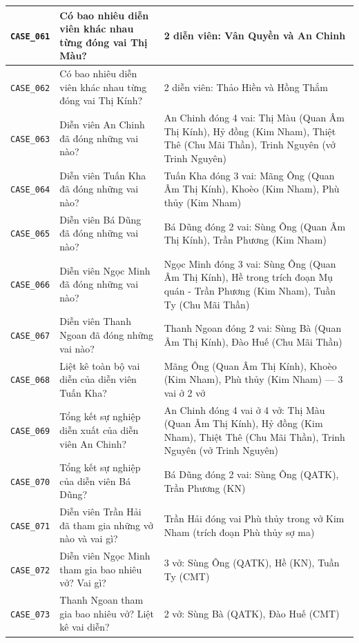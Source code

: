 \begin{longtable}{|p{1.9cm}|p{5.2cm}|p{7.3cm}|}
  \hline
  \texttt{CASE\_061} & Có bao nhiêu diễn viên khác nhau từng đóng vai Thị Màu? & 2 diễn viên: Vân Quyền và An Chinh \\
  \hline
  \texttt{CASE\_062} & Có bao nhiêu diễn viên khác nhau từng đóng vai Thị Kính? & 2 diễn viên: Thảo Hiền và Hồng Thắm \\
  \hline
  \texttt{CASE\_063} & Diễn viên An Chinh đã đóng những vai nào? & An Chinh đóng 4 vai: Thị Màu (Quan Âm Thị Kính), Hỷ đồng (Kim Nham), Thiệt Thê (Chu Mãi Thần), Trinh Nguyên (vở Trinh Nguyên) \\
  \hline
  \texttt{CASE\_064} & Diễn viên Tuấn Kha đã đóng những vai nào? & Tuấn Kha đóng 3 vai: Mãng Ông (Quan Âm Thị Kính), Khoèo (Kim Nham), Phù thủy (Kim Nham) \\
  \hline
  \texttt{CASE\_065} & Diễn viên Bá Dũng đã đóng những vai nào? & Bá Dũng đóng 2 vai: Sùng Ông (Quan Âm Thị Kính), Trần Phương (Kim Nham) \\
  \hline
  \texttt{CASE\_066} & Diễn viên Ngọc Minh đã đóng những vai nào? & Ngọc Minh đóng 3 vai: Sùng Ông (Quan Âm Thị Kính), Hề trong trích đoạn Mụ quán - Trần Phương (Kim Nham), Tuần Ty (Chu Mãi Thần) \\
  \hline
  \texttt{CASE\_067} & Diễn viên Thanh Ngoan đã đóng những vai nào? & Thanh Ngoan đóng 2 vai: Sùng Bà (Quan Âm Thị Kính), Đào Huế (Chu Mãi Thần) \\
  \hline
  \texttt{CASE\_068} & Liệt kê toàn bộ vai diễn của diễn viên Tuấn Kha? & Mãng Ông (Quan Âm Thị Kính), Khoèo (Kim Nham), Phù thủy (Kim Nham) — 3 vai ở 2 vở \\
  \hline
  \texttt{CASE\_069} & Tổng kết sự nghiệp diễn xuất của diễn viên An Chinh? & An Chinh đóng 4 vai ở 4 vở: Thị Màu (Quan Âm Thị Kính), Hỷ đồng (Kim Nham), Thiệt Thê (Chu Mãi Thần), Trinh Nguyên (vở Trinh Nguyên) \\
  \hline
  \texttt{CASE\_070} & Tổng kết sự nghiệp của diễn viên Bá Dũng? & Bá Dũng đóng 2 vai: Sùng Ông (QATK), Trần Phương (KN) \\
  \hline
  \texttt{CASE\_071} & Diễn viên Trần Hải đã tham gia những vở nào và vai gì? & Trần Hải đóng vai Phù thủy trong vở Kim Nham (trích đoạn Phù thủy sợ ma) \\
  \hline
  \texttt{CASE\_072} & Diễn viên Ngọc Minh tham gia bao nhiêu vở? Vai gì? & 3 vở: Sùng Ông (QATK), Hề (KN), Tuần Ty (CMT) \\
  \hline
  \texttt{CASE\_073} & Thanh Ngoan tham gia bao nhiêu vở? Liệt kê vai diễn? & 2 vở: Sùng Bà (QATK), Đào Huế (CMT) \\

\end{longtable}
